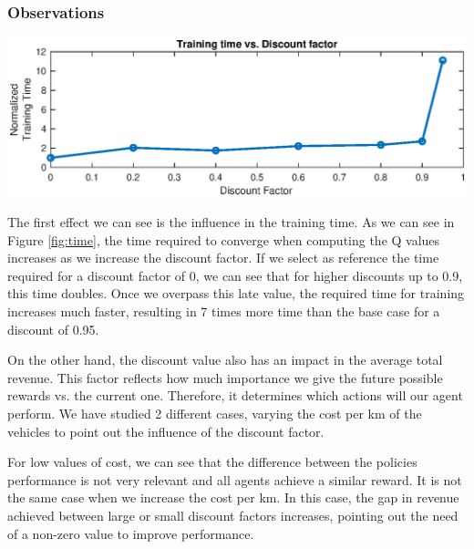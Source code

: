 \documentclass[11pt]{article}
\begin{document}
\subsubsection{Observations}


\begin{minipage}[]{\textwidth}

\begin{minipage}[]{0.48\textwidth}
\includegraphics[width=\textwidth]{2-reactive/doc/plots/time-discount-2.eps}
\label{fig:time}
\end{minipage}
\hfill
\begin{minipage}[]{0.5\textwidth}
The first effect we can see is the influence in the training time. As we can see in Figure \ref{fig:time}, the time required to converge when computing the Q values increases as we increase the discount factor. If we select as reference the time required for a discount factor of 0, we can see that for higher discounts up to 0.9, this time doubles. Once we overpass this late value, the required time for training increases much faster, resulting in 7 times more time than the base case for a discount of 0.95. \\
\end{minipage}

\end{minipage}



On the other hand, the discount value also has an impact in the average total revenue. This factor reflects how much importance we give the future possible rewards vs. the current one. Therefore, it determines which actions will our agent perform. We have studied 2 different cases, varying the cost per km of the vehicles to point out the influence of the discount factor. 

For low values of cost, we can see that the difference between the policies performance is not very relevant and all agents achieve a similar reward. It is not the same case when we increase the cost per km. In this case, the gap in revenue achieved between large or small discount factors increases, pointing out the need of a non-zero value to improve performance. 
\end{document}
